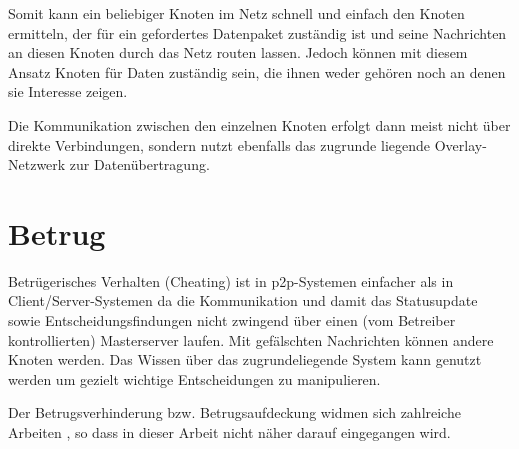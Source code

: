 Somit kann ein beliebiger Knoten im Netz schnell und einfach den Knoten ermitteln, der für ein gefordertes Datenpaket zuständig ist und seine Nachrichten an diesen Knoten durch das Netz routen lassen. Jedoch können mit diesem Ansatz Knoten für Daten zuständig sein, die ihnen weder gehören noch an denen sie Interesse zeigen.

Die Kommunikation zwischen den einzelnen Knoten erfolgt dann meist nicht über direkte Verbindungen, sondern nutzt ebenfalls das zugrunde liegende Overlay-Netzwerk zur Datenübertragung.




\section{Betrug}
Betrügerisches Verhalten (Cheating) ist in p2p-Systemen einfacher als in Client/Server-Systemen da die Kommunikation und damit das Statusupdate sowie Entscheidungsfindungen nicht zwingend über einen (vom Betreiber kontrollierten) Masterserver laufen. Mit gefälschten Nachrichten können andere Knoten werden. Das Wissen über das zugrundeliegende System kann genutzt werden um gezielt wichtige Entscheidungen zu manipulieren.

Der Betrugsverhinderung bzw. Betrugsaufdeckung widmen sich zahlreiche Arbeiten \cite{citeulike:4243521, citeulike:499803, citeulike:3196934, citeulike:4243572, citeulike:6643788}, so dass in dieser Arbeit nicht näher darauf eingegangen wird.
